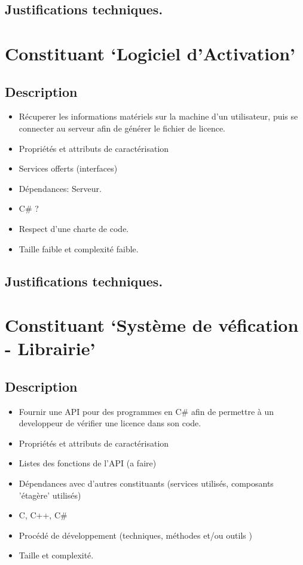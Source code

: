 \subsection{Justifications techniques.}

\section{Constituant `Logiciel d'Activation'}
\subsection{Description}
\begin{itemize}
	\item Récuperer les informations matériels sur la machine d'un utilisateur, puis 
				se connecter au serveur afin de générer le fichier de licence.
	\item Propriétés et attributs de caractérisation
	\item Services offerts (interfaces)
	\item Dépendances: Serveur. 
	\item C\# ?
	\item Respect d'une charte de code. 
	\item Taille faible et complexité faible. 
\end{itemize}
\subsection{Justifications techniques.}

\section{Constituant `Système de véfication - Librairie'}
\subsection{Description}
\begin{itemize}
	\item Fournir une API pour des programmes en C\# afin de 
				permettre à un developpeur de vérifier une licence dans son code.
	\item Propriétés et attributs de caractérisation
	\item Listes des fonctions de l'API (a faire)
	\item Dépendances avec d’autres constituants (services utilisés, composants 'étagère' utilisés)
	\item C, C++, C\#
	\item Procédé de développement (techniques, méthodes et/ou outils )
	\item Taille et complexité.
\end{itemize}
